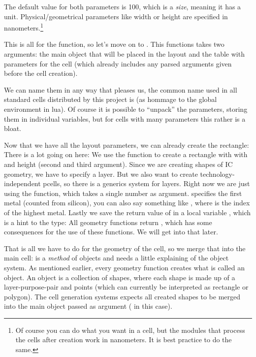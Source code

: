 The default value for both parameters is 100, which is a \emph{size}, meaning it has a unit. Physical/geometrical parameters like width or height are specified
in nanometers.\footnote{Of course you can do what you want in a cell, but the modules that process the cells after creation work in nanometers. It is best
practice to do the same.}

This is all for the  function, so let's move on to . This functions takes two arguments: the main object that will be
placed in the layout and the table with parameters for the cell (which already includes any parsed arguments given before the cell creation). 

We can name them in any way that pleases us, the common name used in all standard cells distributed by this project is  (as hommage to the global
environment  in lua).
Of course it is possible to \enquote{unpack} the parameters, storing them in individual variables, but for cells with many parameters this rather is a bloat.

Now that we have all the layout parameters, we can already create the rectangle:
There is a lot going on here: We use the  function to create a rectangle with with and height (second and third argument). Since we are
creating shapes of IC geometry, we have to specify a layer. But we also want to create technology-independent pcells, so there is a generics system for layers. Right
now we are just using the  function, which takes a single number as argument.  specifies the first metal
(counted from silicon), you can also say something like , where  is the index of the highest metal. Lastly we save the return value
of  in a local variable , which is a hint to the type: All geometry functions return , which has some
consequences for the use of these functions. We will get into that later.

That is all we have to do for the geometry of the cell, so we merge that into the main cell:
 is a \emph{method} of objects and needs a little explaining of the object system. As mentioned
earlier, every geometry function creates what is called an object. An object is a collection of shapes, where each shape is made up of a layer-purpose-pair and
points (which can currently be interpreted as rectangle or polygon). The cell generation systems expects all created shapes to be merged into the main object
passed as argument ( in this case).

